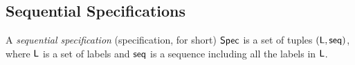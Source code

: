 %
%
%
%
%
%

\subsection{Sequential Specifications}
\label{subsec:sequential specification}


\begin{definition}
  \label{definition:sequential specification} A \emph{sequential
  specification} (specification, for short) $\mathsf{Spec}$ is a set of tuples $(\mathsf{L}, \mathsf{seq})$, where
  $\mathsf{L}$ is a set of labels and
  $\mathsf{seq}$ is a sequence including all the labels in $\mathsf{L}$.
\end{definition}


